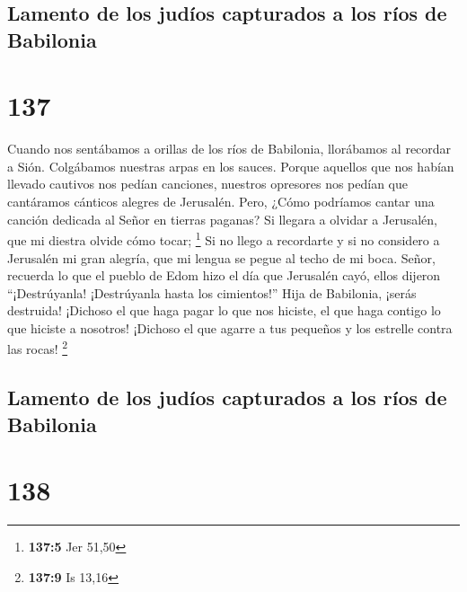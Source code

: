\hypertarget{lamento-de-los-juduxedos-capturados-a-los-ruxedos-de-babilonia}{%
\subsection{Lamento de los judíos capturados a los ríos de
Babilonia}\label{lamento-de-los-juduxedos-capturados-a-los-ruxedos-de-babilonia}}

\hypertarget{section-136}{%
\section{137}\label{section-136}}

 Cuando nos sentábamos a orillas de los ríos de Babilonia,
llorábamos al recordar a Sión.  Colgábamos nuestras arpas en
los sauces.  Porque aquellos que nos habían llevado cautivos
nos pedían canciones, nuestros opresores nos pedían que cantáramos
cánticos alegres de Jerusalén.  Pero, ¿Cómo podríamos cantar
una canción dedicada al Señor en tierras paganas?  Si
llegara a olvidar a Jerusalén, que mi diestra olvide cómo tocar;
\footnote{\textbf{137:5} Jer 51,50}  Si no llego a
recordarte y si no considero a Jerusalén mi gran alegría, que mi lengua
se pegue al techo de mi boca.  Señor, recuerda lo que el
pueblo de Edom hizo el día que Jerusalén cayó, ellos dijeron
``¡Destrúyanla! ¡Destrúyanla hasta los cimientos!''  Hija de
Babilonia, ¡serás destruida! ¡Dichoso el que haga pagar lo que nos
hiciste, el que haga contigo lo que hiciste a nosotros! 
¡Dichoso el que agarre a tus pequeños y los estrelle contra las rocas!
\footnote{\textbf{137:9} Is 13,16}

\hypertarget{lamento-de-los-juduxedos-capturados-a-los-ruxedos-de-babilonia-1}{%
\subsection{Lamento de los judíos capturados a los ríos de
Babilonia}\label{lamento-de-los-juduxedos-capturados-a-los-ruxedos-de-babilonia-1}}

\hypertarget{section-137}{%
\section{138}\label{section-137}}

